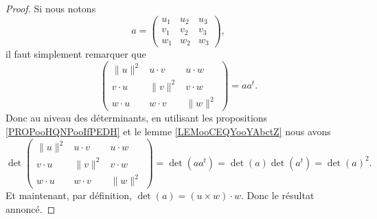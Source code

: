 \begin{proof}
    Si nous notons 
    \begin{equation}
        a= \begin{pmatrix}
                u_1	&	u_2	&	u_3	\\
                v_1	&	v_2	&	v_3	\\
                w_1	&	w_2	&	w_3
        \end{pmatrix},
    \end{equation}
    il faut simplement remarquer que
    \begin{equation}
           \begin{pmatrix}
            \| u \|^2    &   u\cdot v    &   u\cdot w    \\
            v\cdot u    &   \| v \|^2    &   v\cdot w    \\
            w\cdot u    &   w\cdot v    &   \| w \|^2
        \end{pmatrix}=aa^t.
    \end{equation}
    Donc au niveau des déterminants, en utilisant les propositions \ref{PROPooHQNPooIfPEDH} et le lemme \ref{LEMooCEQYooYAbctZ} nous avons
    \begin{equation}
           \det\begin{pmatrix}
            \| u \|^2    &   u\cdot v    &   u\cdot w    \\
            v\cdot u    &   \| v \|^2    &   v\cdot w    \\
            w\cdot u    &   w\cdot v    &   \| w \|^2
        \end{pmatrix}=\det(aa^t)=\det(a)\det(a^t)=\det(a)^2.
    \end{equation}
    Et maintenant, par définition, \( \det(a)=(u\times w)\cdot w\). Donc le résultat annoncé.
\end{proof}

